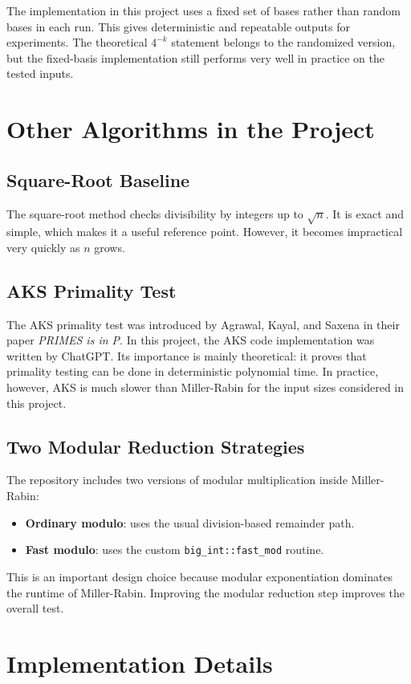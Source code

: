 \documentclass[12pt,a4paper]{report}
\begin{document}
The implementation in this project uses a fixed set of bases rather than random bases in each run. This gives deterministic and repeatable outputs for experiments. The theoretical \(4^{-k}\) statement belongs to the randomized version, but the fixed-basis implementation still performs very well in practice on the tested inputs.

\chapter{Other Algorithms in the Project}
\section{Square-Root Baseline}
The square-root method checks divisibility by integers up to \(\sqrt{n}\). It is exact and simple, which makes it a useful reference point. However, it becomes impractical very quickly as \(n\) grows.

\section{AKS Primality Test}
The AKS primality test was introduced by Agrawal, Kayal, and Saxena in their paper \textit{PRIMES is in P}. In this project, the AKS code implementation was written by ChatGPT. Its importance is mainly theoretical: it proves that primality testing can be done in deterministic polynomial time. In practice, however, AKS is much slower than Miller-Rabin for the input sizes considered in this project.

\section{Two Modular Reduction Strategies}
The repository includes two versions of modular multiplication inside Miller-Rabin:
\begin{itemize}
    \item \textbf{Ordinary modulo}: uses the usual division-based remainder path.
    \item \textbf{Fast modulo}: uses the custom \texttt{big\_int::fast\_mod} routine.
\end{itemize}

This is an important design choice because modular exponentiation dominates the runtime of Miller-Rabin. Improving the modular reduction step improves the overall test.

\chapter{Implementation Details}
\end{document}
